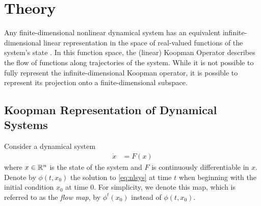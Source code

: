 \section{Theory}
\label{sec:theory}

Any finite-dimensional nonlinear dynamical system has an equivalent infinite-dimensional linear representation in the space of real-valued functions of the system's state \cite{}.
In this function space, the (linear) Koopman Operator describes the flow of functions along trajectories of the system.
While it is not possible to fully represent the infinite-dimensional Koopman operator, it is possible to represent its projection onto a finite-dimensional subspace.


\subsection{Koopman Representation of Dynamical Systems}

Consider a dynamical system
\begin{align}
    \dot{x} &= F (x)    \label{eq:nlsys}
\end{align}
where $x \in \mathbb{R}^n$ is the state of the system and ${F}$ is continuously differentiable in $x$.
Denote by $\phi(t,x_0)$ the solution to \eqref{eq:nlsys} at time $t$ when beginning with the initial condition $x_0$ at time $0$.
For simplicity, we denote this map, which is referred to as the \emph{flow map}, by $\phi^t (x_0)$ instead of $\phi (t, x_0)$.

